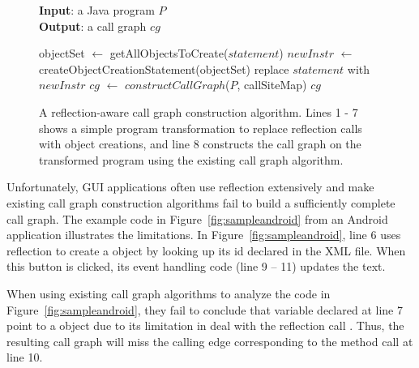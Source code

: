 

\begin{figure}[t]
\textbf{Input}: a Java program $P$\\
\textbf{Output}: a call graph $cg$\\
\vspace{-5mm}
\begin{algorithmic}[1]
\STATE objectSet $\leftarrow$ getAllObjectsToCreate($statement$)
\STATE $newInstr$ $\leftarrow$ createObjectCreationStatement(objectSet)
\STATE replace $statement$ with $newInstr$
\ENDIF
\ENDFOR
\STATE $cg$ $\leftarrow$ $constructCallGraph$($P$, callSiteMap)
\RETURN $cg$
\vspace{-2mm}
\end{algorithmic}
\label{fig:cgalgorithm}
\caption{A reflection-aware call graph construction algorithm. Lines 1
- 7 shows a simple program transformation to replace reflection calls
with object creations, and line 8 constructs the call graph on
the transformed program using the existing call graph algorithm. 
} 
\end{figure}

Unfortunately, GUI applications often use reflection extensively and make
existing call graph construction algorithms fail to build a sufficiently complete
call graph. The example code in Figure~\ref{fig:sampleandroid} from an Android application
 illustrates the limitations.
In Figure~\ref{fig:sampleandroid}, line 6 uses reflection to create a 
object by looking up its id declared in the XML file. When this button
is clicked, its event handling code (line 9 -- 11) updates the text.

When using existing call graph algorithms to analyze the code in Figure~\ref{fig:sampleandroid},
they fail to conclude that variable  declared at line 7
point to a  object due to its limitation in deal with the
reflection call . Thus, the resulting
call graph will miss the calling edge corresponding to the method
call  at line 10. 

